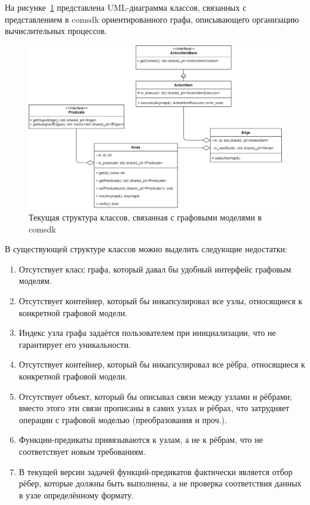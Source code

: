 \def\notedate{2022.03.09}
\def\currentauthor{Тришин И.В. (РК6)}

На рисунке~\ref{fig:oldGraphStructure} представлена UML-диаграмма классов, связанных с представлением в comsdk ориентированного графа, описывающего организацию вычислительных процессов.

\begin{figure}[H]
    \includegraphics[width=\textwidth]{ResearchNotes/rndhpc_not_blo_2022_03_09/structure.png}
    \caption{Текущая структура классов, связанная с графовыми моделями в comsdk}\label{fig:oldGraphStructure}
\end{figure}

В существующей структуре классов можно выделить следующие недостатки:
\begin{enumerate}
    \item Отсутствует класс графа, который давал бы удобный интерфейс графовым моделям.
    \item Отсутствует контейнер, который бы инкапсулировал все узлы, относящиеся к конкретной графовой модели.
    \item Индекс узла графа задаётся пользователем при инициализации, что не гарантирует его уникальности.
    \item Отсутствует контейнер, который бы инкапсулировал все рёбра, относящиеся к конкретной графовой модели.
    \item Отсутствует объект, который бы описывал связи между узлами и рёбрами; вместо этого эти связи прописаны в самих узлах и рёбрах, что затрудняет операции с графовой моделью (преобразования и проч.).
    \item Функции-предикаты привязываются к узлам, а не к рёбрам, что не соответствует новым требованиям.
    \item В текущей версии задачей функций-предикатов фактически является отбор рёбер, которые должны быть выполнены, а не проверка соответствия данных в узле определённому формату.
\end{enumerate}

\noteattributes{}

